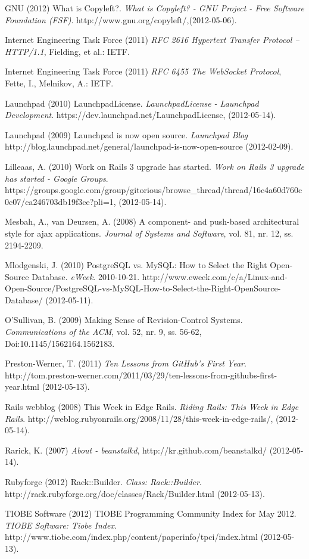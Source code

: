 \begin{flushleft}
GNU (2012) What is Copyleft?. \emph{What is Copyleft? - GNU Project - Free Software Foundation (FSF)}. http://www.gnu.org/copyleft/,(2012-05-06).

Internet Engineering Task Force (2011) \emph{RFC 2616 Hypertext Transfer Protocol -- HTTP/1.1}, Fielding, et al.: IETF.

Internet Engineering Task Force (2011) \emph{RFC 6455 The WebSocket Protocol}, Fette, I., Melnikov, A.: IETF.

Launchpad (2010) LaunchpadLicense. \emph{LaunchpadLicense - Launchpad Development}. https://dev.launchpad.net/LaunchpadLicense, (2012-05-14).

Launchpad (2009) Launchpad is now open source. \emph{Launchpad Blog} http://blog.launchpad.net/general/launchpad-is-now-open-source (2012-02-09).

Lilleaas, A. (2010) Work on Rails 3 upgrade has started. \emph{Work on Rails 3 upgrade has started - Google Groups}. https://groups.google.com/group/gitorious/browse\_thread/thread/16c4a60d760c0c07/ca246703db19f3ce?pli=1, (2012-05-14).

Mesbah, A., van Deursen, A. (2008) A component- and push-based architectural style for ajax applications. \emph{Journal of Systems and Software}, vol. 81, nr. 12, ss. 2194-2209.

Mlodgenski, J. (2010) PostgreSQL vs. MySQL: How to Select the Right Open-Source Database. \emph{eWeek}. 2010-10-21.  http://www.eweek.com/c/a/Linux-and-Open-Source/PostgreSQL-vs-MySQL-How-to-Select-the-Right-OpenSource-Database/ (2012-05-11).

O'Sullivan, B. (2009) Making Sense of Revision-Control Systems. \emph{Communications of the ACM}, vol. 52, nr. 9, ss. 56-62, Doi:10.1145/1562164.1562183.

Preston-Werner, T. (2011) \emph{Ten Lessons from GitHub's First Year}. http://tom.preston-werner.com/2011/03/29/ten-lessons-from-githubs-first-year.html (2012-05-13).

Rails webblog (2008) This Week in Edge Rails. \emph{Riding Rails: This Week in Edge Rails}. http://weblog.rubyonrails.org/2008/11/28/this-week-in-edge-rails/, (2012-05-14).

Rarick, K. (2007) \emph{About - beanstalkd}, http://kr.github.com/beanstalkd/ (2012-05-14).

Rubyforge (2012) Rack::Builder. \emph{Class: Rack::Builder}. http://rack.rubyforge.org/doc/classes/Rack/Builder.html (2012-05-13).

TIOBE Software (2012) TIOBE Programming Community Index for May 2012. \emph{TIOBE Software: Tiobe Index}. http://www.tiobe.com/index.php/content/paperinfo/tpci/index.html (2012-05-13).


\end{flushleft}
